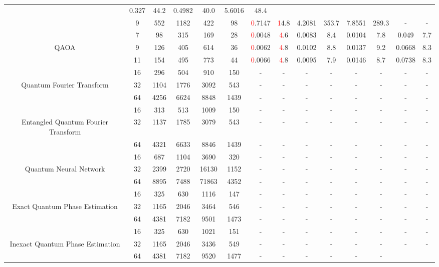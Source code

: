 \begin{table}[htb]
{\begin{tabular}{|c|c|c|c|c|c|c|c|c|c|c|c|c|c|}
 & 0.327 & 44.2
 & 0.4982 & 40.0
 & 5.6016 & 48.4
 \\
 & 
9 & 552 & 1182 & 422 & 98
 & \textcolor{red}0.7147 & \textcolor{red}14.8
 & 4.2081 & 353.7
 & 7.8551 & 289.3
 & - & -
 \\
\hline
 & 
7 & 98 & 315 & 169 & 28
 & \textcolor{red}0.0048 & \textcolor{red}4.6
 & 0.0083 & 8.4
 & 0.0104 & 7.8
 & 0.049 & 7.7
 \\
QAOA & 
9 & 126 & 405 & 614 & 36
 & \textcolor{red}0.0062 & \textcolor{red}4.8
 & 0.0102 & 8.8
 & 0.0137 & 9.2
 & 0.0668 & 8.3
 \\
 & 
11 & 154 & 495 & 773 & 44
 & \textcolor{red}0.0066 & \textcolor{red}4.8
 & 0.0095 & 7.9
 & 0.0146 & 8.7
 & 0.0738 & 8.3
 \\
\hline
 & 
16 & 296 & 504 & 910 & 150
 & - & -
 & - & -
 & - & -
 & - & -
 \\
Quantum Fourier Transform & 
32 & 1104 & 1776 & 3092 & 543
 & - & -
 & - & -
 & - & -
 & - & -
 \\
 & 
64 & 4256 & 6624 & 8848 & 1439
 & - & -
 & - & -
 & - & -
 & - & -
 \\
\hline
 & 
16 & 313 & 513 & 1009 & 150
 & - & -
 & - & -
 & - & -
 & - & -
 \\
Entangled Quantum Fourier Transform & 
32 & 1137 & 1785 & 3079 & 543
 & - & -
 & - & -
 & - & -
 & - & -
 \\
 & 
64 & 4321 & 6633 & 8846 & 1439
 & - & -
 & - & -
 & - & -
 & - & -
 \\
\hline
 & 
16 & 687 & 1104 & 3690 & 320
 & - & -
 & - & -
 & - & -
 & - & -
 \\
Quantum Neural Network & 
32 & 2399 & 2720 & 16130 & 1152
 & - & -
 & - & -
 & - & -
 & - & -
 \\
 & 
64 & 8895 & 7488 & 71863 & 4352
 & - & -
 & - & -
 & - & -
 & - & -
 \\
\hline
 & 
16 & 325 & 630 & 1116 & 147
 & - & -
 & - & -
 & - & -
 & - & -
 \\
Exact Quantum Phase Estimation & 
32 & 1165 & 2046 & 3464 & 546
 & - & -
 & - & -
 & - & -
 & - & -
 \\
 & 
64 & 4381 & 7182 & 9501 & 1473
 & - & -
 & - & -
 & - & -
 & - & -
 \\
\hline
 & 
16 & 325 & 630 & 1021 & 151
 & - & -
 & - & -
 & - & -
 & - & -
 \\
Inexact Quantum Phase Estimation & 
32 & 1165 & 2046 & 3436 & 549
 & - & -
 & - & -
 & - & -
 & - & -
 \\
 & 
64 & 4381 & 7182 & 9520 & 1477
 & - & -
 & - & -
 & - & -

\end{tabular}}
\end{table}
